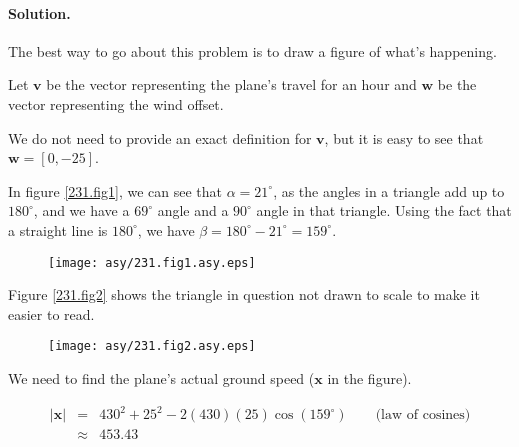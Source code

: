 
\paragraph{Solution.}


The best way to go about this problem is to draw a figure of what's happening.

Let $\mathbf{v}$ be the vector representing the plane's travel for an hour and $\mathbf{w}$ be the vector representing the wind offset.

We do not need to provide an exact definition for $\mathbf{v}$, but it is easy to see that $\mathbf{w}=\left[0,-25\right]$.

In figure \vref{231.fig1}, we can see that $\alpha=21^\circ$, as the angles in a triangle add up to $180^\circ$, and we have a $69^\circ$ angle and a $90^\circ$ angle in that triangle. Using the fact that a straight line is $180^\circ$, we have $\beta=180^\circ-21^\circ=159^\circ$.

\begin{figure}[h]\caption{}\label{231.fig1}\begin{center}\texttt{[image: asy/231.fig1.asy.eps]}\end{center}\end{figure}

Figure \vref{231.fig2} shows the triangle in question not drawn to scale to make it easier to read.

\begin{figure}[h]\caption{}\label{231.fig2}\begin{center}\texttt{[image: asy/231.fig2.asy.eps]}\end{center}\end{figure}

We need to find the plane's actual ground speed ($\mathbf{x}$ in the figure).

\begin{eqnarray*}
	\left|\mathbf{x}\right|&=&430^2+25^2-2\left(430\right)\left(25\right)\cos\left(159^\circ\right)\qquad\mbox{(law of cosines)}\\
	&\approx&453.43
\end{eqnarray*}

